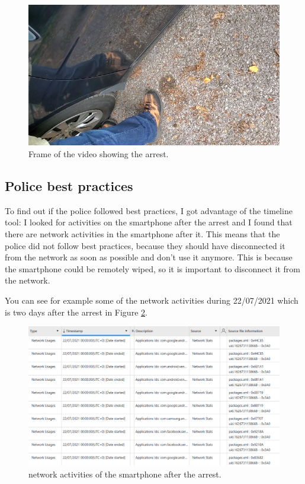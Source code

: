 \documentclass[12pt]{article}
\begin{document}
\begin{figure}[!ht]
    \centering
    \includegraphics[width=\textwidth]{images/arrest-frame.png}
    \caption{Frame of the video showing the arrest.}
    \label{fig:rec-file}
\end{figure}

\subsection{Police best practices}

To find out if the police followed best practices, I got advantage of the timeline tool: I looked for activities on the smartphone after the arrest and I found that there are network activities in the smartphone after it. This means that the police did not follow best practices, because they should have disconnected it from the network as soon as possible and don't use it anymore. This is because the smartphone could be remotely wiped, so it is important to disconnect it from the network.

You can see for example some of the network activities during 22/07/2021 which is two days after the arrest in Figure \ref{fig:pbp}.

\begin{figure}[!ht]
    \centering
    \includegraphics[width=\textwidth]{images/pbp.png}
    \caption{network activities of the smartphone after the arrest.}
    \label{fig:pbp}
\end{figure}
\end{document}
